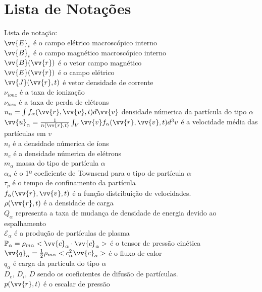 \documentclass[12pt,oneside,a4paper]{abntex2}
\theoremstyle{definition}  %
\begin{document}
\chapter{Lista de Notações}
\label{Listanot}
Lista de notação:\\
$\vv{E}_i$ é o campo elétrico macroscópico interno\\
$\vv{B}_i$ é o campo magnético macroscópico interno\\
$\vv{B}(\vv{r})$ é o vetor campo magnético\\
$\vv{E}(\vv{r})$ é o campo elétrico\\
$\vv{J}(\vv{r},t)$ é vetor densidade de corrente\\
$\nu_{ionz}$ é a taxa de ionização\\
$\nu_{loss}$ é a taxa de perda de elétrons\\
$n_{\alpha} = \int{f_\alpha(\vv{r},\vv{v},t)}d\vv{v}$ densidade númerica da partícula do tipo $\alpha$\\
$\vv{u}_{\alpha} = \frac{1}{n(\vv{r},t)} \int_V{\vv{v} f_{\alpha}(\vv{r},\vv{v},t) d^3v}$ é a velocidade média das partículas em $v$\\
$n_i$ é a densidade númerica de íons\\
$n_e$ é a densidade númerica de elétrons\\
$m_\alpha$ massa do tipo de partícula $\alpha$\\
$\alpha_a$ é o 1º coeficiente de Townsend para o tipo de partícula $\alpha$ \\
$\tau_p$ é o tempo de confinamento da partícula\\
$f_\alpha(\vv{r},\vv{v},t)$ é a função distribuição de velocidades.\\
$\rho(\vv{r},t)$ é a densidade de carga\\
$Q_\alpha$ representa a taxa de mudança de densidade de energia devido ao espalhamento\\
$\mathcal{E}_\alpha$ é a produção de partículas de plasma\\
 $\mathbb{P}_\alpha = \rho_{m\alpha}<\vv{c}_\alpha \cdot \vv{c}_\alpha>$ é o tensor de pressão cinética\\ 
$\vv{q}_\alpha = \frac{1}{2} \rho_{m\alpha} <c^2_\alpha  \vv{c}_\alpha>$ é o fluxo de calor \\
$q_\alpha$ é carga da partícula do tipo $\alpha$ \\
$D_e$, $D_i$, $D$ sendo os coeficientes de difusão de partículas. \\
$p(\vv{r},t)$ é o escalar de pressão\\
\end{document}
